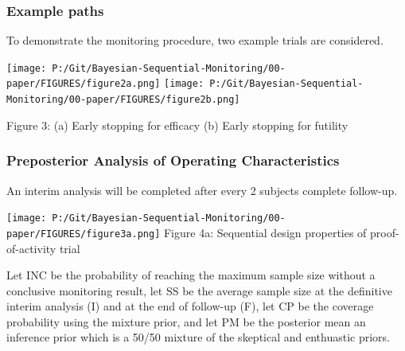 \documentclass[12pt]{article}
\begin{document}
\subsubsection{Example paths}
To demonstrate the monitoring procedure, two example trials are considered. 
\begin{center}
\texttt{[image: P:/Git/Bayesian-Sequential-Monitoring/00-paper/FIGURES/figure2a.png]}
\texttt{[image: P:/Git/Bayesian-Sequential-Monitoring/00-paper/FIGURES/figure2b.png]}

Figure 3: (a) Early stopping for efficacy (b) Early stopping for futility
\end{center}
\newpage
\subsubsection{Preposterior Analysis of Operating Characteristics}
An interim analysis will be completed after every 2 subjects complete follow-up.
\begin{center}
\texttt{[image: P:/Git/Bayesian-Sequential-Monitoring/00-paper/FIGURES/figure3a.png]}
Figure 4a: Sequential design properties of proof-of-activity trial
\end{center}
Let INC be the probability of reaching the maximum sample size without a conclusive monitoring result, let SS be the average sample size at the definitive interim analysis (I) and at the end of follow-up (F), let CP be the coverage probability using the mixture prior, and let PM be the posterior mean an inference prior which is a 50/50 mixture of the skeptical and enthuastic priors.
\end{document}
